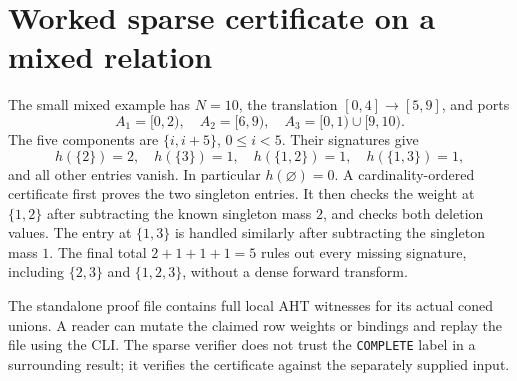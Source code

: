\documentclass[11pt,letterpaper]{article}
\newcommand{\code}[1]{\nolinkurl{#1}}
\begin{document}
\section{Worked sparse certificate on a mixed relation}
The small mixed example has $N=10$, the translation $[0,4]\to[5,9]$, and
ports
\[
 A_1=[0,2),\quad A_2=[6,9),\quad A_3=[0,1)\cup[9,10).
\]
The five components are $\{i,i+5\}$, $0\leq i<5$. Their signatures give
\[
 h(\{2\})=2,\quad h(\{3\})=1,\quad
 h(\{1,2\})=1,\quad h(\{1,3\})=1,
\]
and all other entries vanish. In particular $h(\varnothing)=0$.
A cardinality-ordered certificate first proves the two singleton entries.
It then checks the weight at $\{1,2\}$ after subtracting the known singleton
mass $2$, and checks both deletion values. The entry at $\{1,3\}$ is
handled similarly after subtracting the singleton mass $1$. The final total
$2+1+1+1=5$ rules out every missing signature, including $\{2,3\}$ and
$\{1,2,3\}$, without a dense forward transform.

The standalone proof file contains full local AHT witnesses for its actual
coned unions. A reader can mutate the claimed row weights or bindings and
replay the file using the CLI. The sparse verifier does not trust the
\code{COMPLETE} label in a surrounding result; it verifies the certificate
against the separately supplied input.
\end{document}
